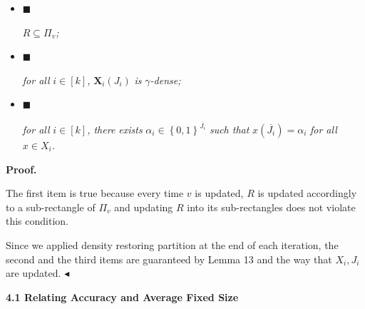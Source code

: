\documentclass[10pt,a4paper]{article}
\begin{document}
\begin{itemize}


\item[] 
$\blacksquare$ 


$R\subseteq\Pi_{v}$\emph{;}\par





\item[] 
$\blacksquare$ 


\emph{for all }$i\in[k]$\emph{, }$\bm{X}_{i}(J_{i})$\emph{ is }$\gamma$\emph{-dense;}\par





\item[] 
$\blacksquare$ 


\emph{for all }$i\in[k]$\emph{, there exists }$\alpha_{i}\in\left\{0,1\right\}^{\overline{J_{i}}}$\emph{ such that }$x(\overline{J_{i}})=\alpha_{i}$\emph{ for all }$x\in X_{i}$\emph{.}\par





\end{itemize}






\par\medskip\noindent\textbf{Proof.}\par




The first item is true because every time $v$ is updated,
$R$ is updated accordingly to a sub-rectangle of $\Pi_{v}$ and updating $R$ into its sub-rectangles does not violate this condition.\par




Since we applied density restoring partition at the end of each iteration, the second and the third items are guaranteed by Lemma 13 and the way that $X_{i},J_{i}$ are updated.
$\blacktriangleleft$\par






\par\medskip\noindent\textbf{
4.1 Relating Accuracy and Average Fixed Size}\par
\end{document}
